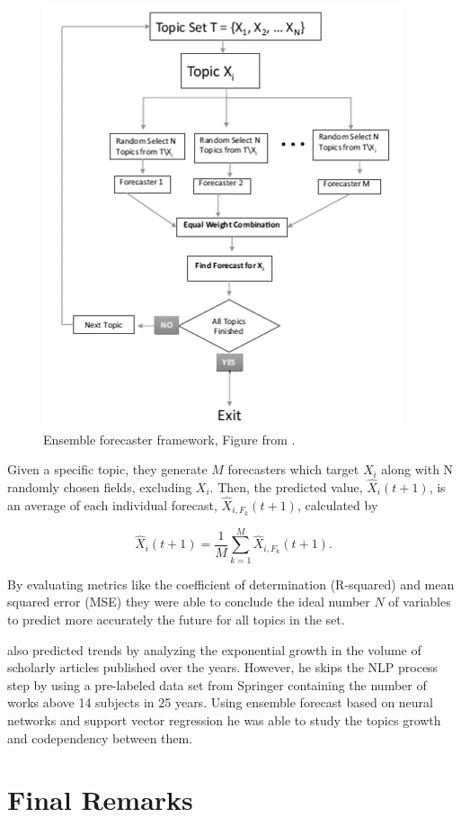 \begin{figure}[h!]
	\centering
	\includegraphics[width=0.5\linewidth]{01.Chapters/03.RelatedWorks/ensemble-forecasting-framework}
	\caption{Ensemble forecaster framework, Figure from  \cite{hurtado2016topic}.}
	\label{fig:ensemble-forecasting-framework}
\end{figure}

Given a specific topic, they generate $M$ forecasters which target $X_{i}$ along with N randomly chosen fields, excluding $X_{i}$. Then, the predicted value, $\hat{X}_{i}(t+1)$, is an average of each individual forecast, $\hat{X}_{i, F_{k}}(t+1)$, calculated by 

\begin{equation}
	\hat{X}_{i}(t+1) = \dfrac{1}{M} \sum_{k=1}^{M}\hat{X}_{i, F_{k}}(t+1)\text{.}
\end{equation}

By evaluating metrics like the coefficient of determination (R-squared) and mean squared error (MSE) they were able to conclude the ideal number $N$ of variables to predict more accurately the future for all topics in the set.

 also predicted trends by analyzing the exponential growth in the volume of scholarly articles published over the years. However, he skips the NLP process step by using a pre-labeled data set from Springer containing the number of works above 14 subjects in 25 years. Using ensemble forecast based on neural networks and support vector regression he was able to study the topics growth and codependency between them.


\newpage
\section{Final Remarks}

